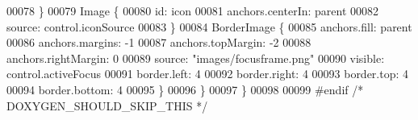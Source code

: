 \begin{DoxyCode}
00078         \}
00079         Image \{
00080             \textcolor{keywordtype}{id}: icon
00081             anchors.centerIn: parent
00082             source: control.iconSource
00083         \}
00084         BorderImage \{
00085             anchors.fill: parent
00086             anchors.margins: -1
00087             anchors.topMargin: -2
00088             anchors.rightMargin: 0
00089             source: \textcolor{stringliteral}{"images/focusframe.png"}
00090             visible: control.activeFocus
00091             border.left: 4
00092             border.right: 4
00093             border.top: 4
00094             border.bottom: 4
00095         \}
00096     \}
00097 \}
00098 
00099 \textcolor{preprocessor}{#endif }\textcolor{comment}{/* DOXYGEN\_SHOULD\_SKIP\_THIS */}\textcolor{preprocessor}{}
\end{DoxyCode}
